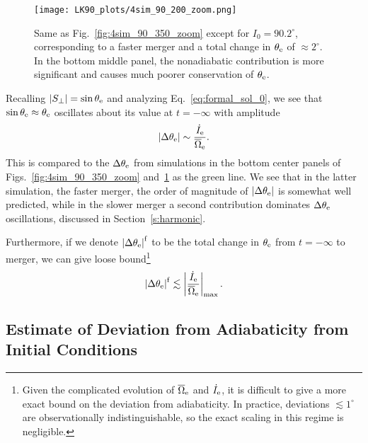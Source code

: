 \documentclass[
        twocolumn,
        twocolappendix
    ]{aastex63}
\newcommand*{\abs}[1]{\left|#1\right|}
\begin{document}
\begin{figure*}
    \centering
    \texttt{[image: LK90\_plots/4sim\_90\_200\_zoom.png]}
    \caption{Same as Fig.~\ref{fig:4sim_90_350_zoom} except for $I_0 =
    90.2^\circ$, corresponding to a faster merger and a total change in
    $\theta_{\rm e}$ of $\approx 2^\circ$. In the bottom middle panel, the
    nonadiabatic contribution is more significant and causes much poorer
    conservation of $\theta_{\rm e}$.}\label{fig:4sim_90_200_zoom}
\end{figure*}

Recalling $\abs{S_{\perp}} = \sin \theta_{\rm e}$ and analyzing
Eq.~\eqref{eq:formal_sol_0}, we see that $\sin \theta_{\rm e} \approx
\theta_{\rm e}$ oscillates about its value at $t = -\infty$ with amplitude
\begin{equation}
    \abs{\Delta \theta_{\rm e}} \sim
        \frac{\dot{I}_{\rm e}}{\overline{\Omega}_{\rm e}}.\label{eq:nonad_dqeff}
\end{equation}
This is compared to the $\Delta \theta_{\rm e}$ from simulations in the bottom
center panels of Figs.~\ref{fig:4sim_90_350_zoom} and~\ref{fig:4sim_90_200_zoom}
as the green line. We see that in the latter simulation, the faster merger, the
order of magnitude of $\abs{\Delta \theta_{\rm e}}$ is somewhat well predicted,
while in the slower merger a second contribution dominates $\Delta \theta_{\rm
e}$ oscillations, discussed in Section~\ref{s:harmonic}.

Furthermore, if we denote $\abs{\Delta \theta_{\rm e}}^{\rm f}$ to be the total
change in $\theta_{\rm e}$ from $t = -\infty$ to merger, we can give loose
bound\footnote{Given the complicated evolution of $\overline{\Omega}_{\rm e}$
and $\dot{I}_{\rm e}$, it is difficult to give a more exact bound on the
deviation from adiabaticity. In practice, deviations $\lesssim 1^\circ$ are
observationally indistinguishable, so the exact scaling in this regime is
negligible.}
\begin{equation}
    \abs{\Delta \theta_{\rm e}}^{\rm f} \lesssim
        \abs{\frac{\dot{I}_{\rm e}}{\overline{\Omega}_{\rm e}}}_{\max}.
        \label{eq:nonad_dqeff_tot}
\end{equation}

\subsection{Estimate of Deviation from Adiabaticity from Initial Conditions}
\end{document}
